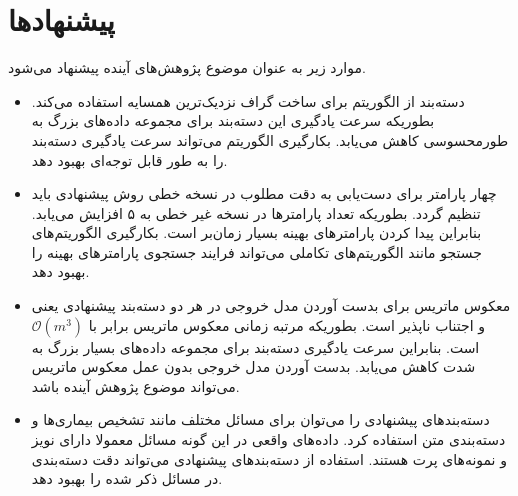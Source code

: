 \section{پیشنهادها}\label{sec:6:4}
موارد زیر به عنوان موضوع پژوهش‌های آینده پیشنهاد می‌شود.
\begin{itemize}[label=$\bullet$]
	\item دسته‌بند   از الگوریتم   برای ساخت گراف نزدیک‌ترین همسایه استفاده می‌کند. بطوریکه سرعت یادگیری این دسته‌بند برای مجموعه داده‌های بزرگ به طورمحسوسی کاهش می‌یابد. بکارگیری الگوریتم   می‌تواند سرعت یادگیری دسته‌بند را به طور قابل توجه‌ای بهبود دهد.
	\item چهار پارامتر برای دست‌یابی به دقت مطلوب در نسخه خطی روش پیشنهادی   باید تنظیم گردد. بطوریکه تعداد پارامترها در نسخه غیر خطی به ۵ افزایش می‌یابد.  بنابراین  پیدا کردن پارامترهای بهینه بسیار زمان‌بر است. بکارگیری الگوریتم‌های جستجو مانند الگوریتم‌های تکاملی می‌تواند فرایند جستجوی پارامترهای بهینه را بهبود دهد.
	\item معکوس ماتریس برای بدست آوردن مدل خروجی در هر دو دسته‌بند پیشنهادی یعنی  و   اجتناب ناپذیر است. بطوریکه مرتبه زمانی معکوس ماتریس  برابر با $\mathcal{O}(m^{3})$ است. بنابراین سرعت یادگیری دسته‌بند برای مجموعه داده‌های بسیار بزرگ به شدت کاهش می‌یابد. بدست آوردن مدل خروجی بدون عمل معکوس ماتریس می‌تواند موضوع پژوهش آینده باشد.
	\item دسته‌بندهای پیشنهادی را می‌توان برای مسائل مختلف مانند تشخیص بیماری‌ها و دسته‌بندی متن استفاده کرد. داده‌های واقعی در این گونه مسائل معمولا دارای نویز و نمونه‌های پرت هستند. استفاده از دسته‌بندهای پیشنهادی می‌تواند دقت دسته‌بندی در مسائل ذکر شده را بهبود دهد.  
\end{itemize}

